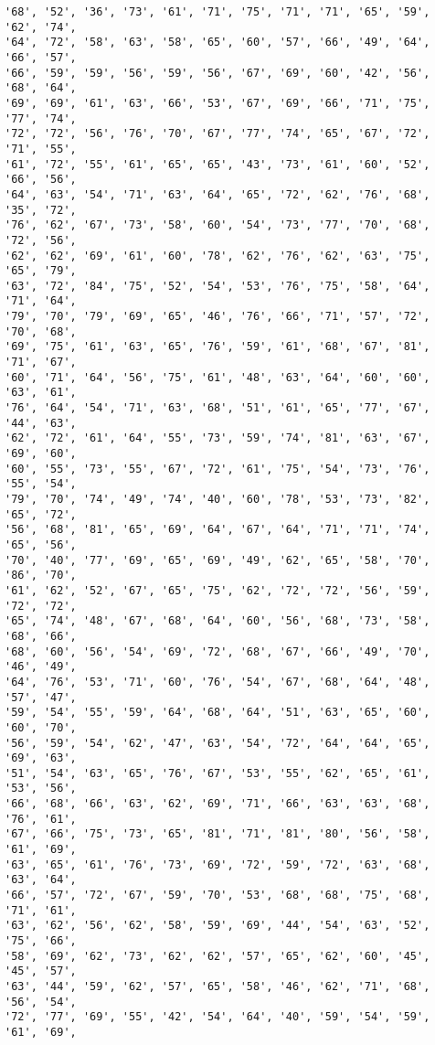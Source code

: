 \documentclass[11pt]{article}
\begin{document}
\begin{Verbatim}[commandchars=\\\{\}]
'68', '52', '36', '73', '61', '71', '75', '71', '71', '65', '59', '62', '74',
'64', '72', '58', '63', '58', '65', '60', '57', '66', '49', '64', '66', '57',
'66', '59', '59', '56', '59', '56', '67', '69', '60', '42', '56', '68', '64',
'69', '69', '61', '63', '66', '53', '67', '69', '66', '71', '75', '77', '74',
'72', '72', '56', '76', '70', '67', '77', '74', '65', '67', '72', '71', '55',
'61', '72', '55', '61', '65', '65', '43', '73', '61', '60', '52', '66', '56',
'64', '63', '54', '71', '63', '64', '65', '72', '62', '76', '68', '35', '72',
'76', '62', '67', '73', '58', '60', '54', '73', '77', '70', '68', '72', '56',
'62', '62', '69', '61', '60', '78', '62', '76', '62', '63', '75', '65', '79',
'63', '72', '84', '75', '52', '54', '53', '76', '75', '58', '64', '71', '64',
'79', '70', '79', '69', '65', '46', '76', '66', '71', '57', '72', '70', '68',
'69', '75', '61', '63', '65', '76', '59', '61', '68', '67', '81', '71', '67',
'60', '71', '64', '56', '75', '61', '48', '63', '64', '60', '60', '63', '61',
'76', '64', '54', '71', '63', '68', '51', '61', '65', '77', '67', '44', '63',
'62', '72', '61', '64', '55', '73', '59', '74', '81', '63', '67', '69', '60',
'60', '55', '73', '55', '67', '72', '61', '75', '54', '73', '76', '55', '54',
'79', '70', '74', '49', '74', '40', '60', '78', '53', '73', '82', '65', '72',
'56', '68', '81', '65', '69', '64', '67', '64', '71', '71', '74', '65', '56',
'70', '40', '77', '69', '65', '69', '49', '62', '65', '58', '70', '86', '70',
'61', '62', '52', '67', '65', '75', '62', '72', '72', '56', '59', '72', '72',
'65', '74', '48', '67', '68', '64', '60', '56', '68', '73', '58', '68', '66',
'68', '60', '56', '54', '69', '72', '68', '67', '66', '49', '70', '46', '49',
'64', '76', '53', '71', '60', '76', '54', '67', '68', '64', '48', '57', '47',
'59', '54', '55', '59', '64', '68', '64', '51', '63', '65', '60', '60', '70',
'56', '59', '54', '62', '47', '63', '54', '72', '64', '64', '65', '69', '63',
'51', '54', '63', '65', '76', '67', '53', '55', '62', '65', '61', '53', '56',
'66', '68', '66', '63', '62', '69', '71', '66', '63', '63', '68', '76', '61',
'67', '66', '75', '73', '65', '81', '71', '81', '80', '56', '58', '61', '69',
'63', '65', '61', '76', '73', '69', '72', '59', '72', '63', '68', '63', '64',
'66', '57', '72', '67', '59', '70', '53', '68', '68', '75', '68', '71', '61',
'63', '62', '56', '62', '58', '59', '69', '44', '54', '63', '52', '75', '66',
'58', '69', '62', '73', '62', '62', '57', '65', '62', '60', '45', '45', '57',
'63', '44', '59', '62', '57', '65', '58', '46', '62', '71', '68', '56', '54',
'72', '77', '69', '55', '42', '54', '64', '40', '59', '54', '59', '61', '69',

\end{Verbatim}
\end{document}
